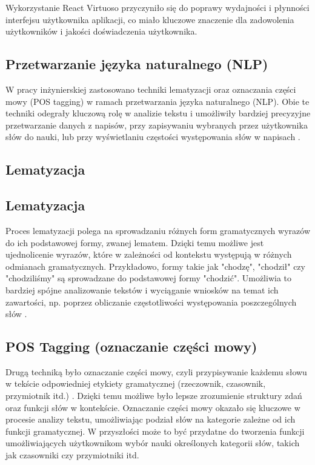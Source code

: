 Wykorzystanie React Virtuoso przyczyniło się do poprawy wydajności i płynności interfejsu użytkownika  aplikacji, co miało kluczowe znaczenie dla zadowolenia użytkowników i jakości doświadczenia użytkownika.

\subsection{Przetwarzanie języka naturalnego (NLP)}
W pracy inżynierskiej zastosowano techniki lematyzacji oraz oznaczania części mowy (POS tagging) w ramach przetwarzania języka naturalnego (NLP). Obie te techniki odegrały kluczową rolę w analizie tekstu i umożliwiły bardziej precyzyjne przetwarzanie danych z napisów, przy zapisywaniu wybranych przez użytkownika słów do nauki, lub przy wyświetlaniu częstości występowania słów w napisach \cite{NLPforNLP}.

\subsection*{Lematyzacja}
\subsection*{Lematyzacja}
Proces lematyzacji polega na sprowadzaniu różnych form gramatycznych wyrazów do ich podstawowej formy, zwanej lematem. Dzięki temu możliwe jest ujednolicenie wyrazów, które w zależności od kontekstu występują w różnych odmianach gramatycznych. Przykładowo, formy takie jak "chodzę", "chodził" czy "chodziliśmy" są sprowadzane do podstawowej formy "chodzić". Umożliwia to bardziej spójne analizowanie tekstów i wyciąganie wniosków na temat ich zawartości, np. poprzez obliczanie częstotliwości występowania poszczególnych słów \cite{NLPforNLP}.

\subsection*{POS Tagging (oznaczanie części mowy)}
Drugą techniką było oznaczanie części mowy, czyli przypisywanie każdemu słowu w tekście odpowiedniej etykiety gramatycznej (rzeczownik, czasownik, przymiotnik itd.)  \cite{NLPforNLP}. Dzięki temu możliwe było lepsze zrozumienie struktury zdań oraz funkcji słów w kontekście. Oznaczanie części mowy okazało się kluczowe w procesie analizy tekstu, umożliwiając podział słów na kategorie zależne od ich funkcji gramatycznej. W przyszłości może to być przydatne do tworzenia funkcji umożliwiających użytkownikom wybór nauki określonych kategorii słów, takich jak czasowniki czy przymiotniki itd.



